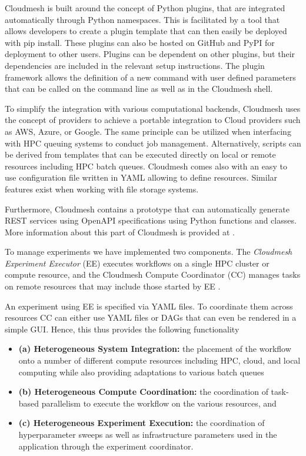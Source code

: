 \documentclass[sigconf]{acmart}
\begin{document}
Cloudmesh is built around the concept of Python plugins, that are integrated automatically through Python namespaces. This is facilitated by a tool that allows developers to create a plugin template that can then easily be deployed with pip install. These plugins can also be hosted on GitHub and PyPI for deployment to other users. Plugins can be dependent on other plugins, but their dependencies are included in the relevant setup instructions. The plugin framework allows the definition of a new command with user defined parameters that can be called on the command line as well as in the Cloudmesh shell.

To simplify the integration with various computational backends, Cloudmesh uses the concept of providers to achieve a portable integration to Cloud providers such as AWS, Azure, or Google. The same principle can be utilized when interfacing with HPC queuing systems to conduct job management. Alternatively, scripts can be derived from templates that can be executed directly on local or remote resources including HPC batch queues. Cloudmesh comes also with an easy to use configuration file written in YAML allowing to define resources. Similar features exist when working with file storage systems. 

Furthermore, Cloudmesh contains a prototype that can automatically generate REST services using OpenAPI specifications using Python functions and classes.  More information about this part of Cloudmesh is provided at \citep{www-cloudmesh-org}.

To manage experiments we have implemented two components. The {\em Cloudmesh Experiment Executor} (EE) executes workflows on a single HPC cluster or compute resource, and the Cloudmesh Compute Coordinator (CC) manages tasks on remote resources that may include those started by EE \citep{las-2022-hybrid}\citep{las-2022-templated}.  

An experiment using EE is specified via YAML files. To coordinate them across resources CC can either use YAML files or DAGs that can even be rendered in a simple GUI. Hence, this thus provides the following functionality 

\begin{itemize}
\item {\bf (a) Heterogeneous System Integration:} the placement of the workflow onto a number of different compute resources including HPC, cloud, and local computing while also providing adaptations to various batch queues
\item {\bf  (b) Heterogeneous Compute Coordination:} the coordination of task-based parallelism to execute the workflow on the various resources, and 
\item  {\bf (c) Heterogeneous Experiment
Execution:} the coordination of hyperparameter sweeps as well as infrastructure parameters used in the application through the experiment coordinator.  

\end{itemize}
\end{document}
